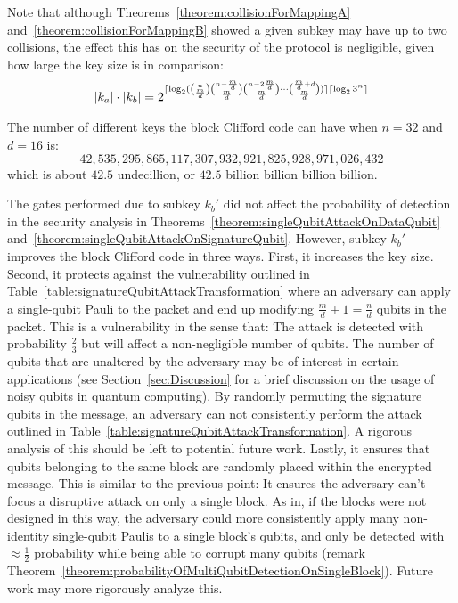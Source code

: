 Note that although Theorems~\ref{theorem:collisionForMappingA} and~\ref{theorem:collisionForMappingB} showed a given subkey may have up to two collisions, the effect this has on the security of the protocol is negligible, given how large the key size is in comparison:
\begin{align}
\lvert k_a \rvert \cdot \lvert k_b \rvert = 2^{\lceil\log_2 ({n \choose \frac{m}{d}}{n - \frac{m}{d} \choose \frac{m}{d}}{n - 2\frac{m}{d} \choose \frac{m}{d}}\cdots{\frac{m}{d} + d \choose \frac{m}{d}})\rceil\lceil\log_2 3^n\rceil}
\end{align}

\begin{example}
The number of different keys the block Clifford code can have when $n = 32$ and $d = 16$ is:
$$42,535,295,865,117,307,932,921,825,928,971,026,432$$
which is about $42.5$ undecillion, or $42.5$ billion billion billion billion.
\end{example}

The gates performed due to subkey $k_b'$ did not affect the probability of detection in the security analysis in Theorems~\ref{theorem:singleQubitAttackOnDataQubit} and~\ref{theorem:singleQubitAttackOnSignatureQubit}. However, subkey $k_b'$ improves the block Clifford code in three ways. First, it increases the key size. Second, it protects against the vulnerability outlined in Table~\ref{table:signatureQubitAttackTransformation} where an adversary can apply a single-qubit Pauli to the packet and end up modifying $\frac{m}{d} + 1 = \frac{n}{d}$ qubits in the packet. This is a vulnerability in the sense that: The attack is detected with probability $\frac{2}{3}$ but will affect a non-negligible number of qubits. The number of qubits that are unaltered by the adversary may be of interest in certain applications (see Section~\ref{sec:Discussion} for a brief discussion on the usage of noisy qubits in quantum computing). By randomly permuting the signature qubits in the message, an adversary can not consistently perform the attack outlined in Table~\ref{table:signatureQubitAttackTransformation}. A rigorous analysis of this should be left to potential future work. Lastly, it ensures that qubits belonging to the same block are randomly placed within the encrypted message. This is similar to the previous point: It ensures the adversary can't focus a disruptive attack on only a single block. As in, if the blocks were not designed in this way, the adversary could more consistently apply many  non-identity single-qubit Paulis to a single block's qubits, and only be detected with $\approx \frac{1}{2}$ probability while being able to corrupt many qubits (remark Theorem~\ref{theorem:probabilityOfMultiQubitDetectionOnSingleBlock}). Future work may more rigorously analyze this.

